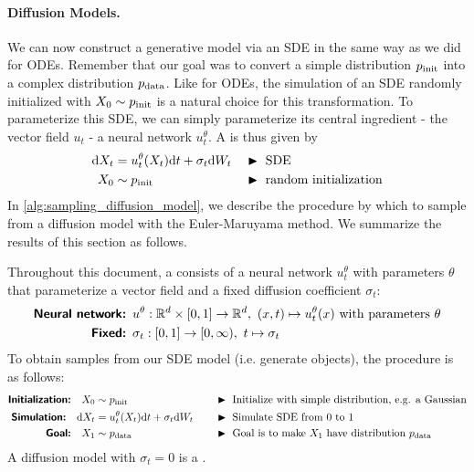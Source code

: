 \paragraph{Diffusion Models.} We can now construct a generative model via an SDE in the same way as we did for ODEs. Remember that our goal was to convert a simple distribution $p_{\rm{init}}$ into a complex distribution $p_{\rm{data}}$. Like for ODEs, the simulation of an SDE randomly initialized with $X_0\sim p_{\rm{init}}$ is a natural choice for this transformation. To parameterize this SDE, we can simply parameterize its central ingredient - the vector field $u_t$ - a neural network $u_t^\theta$. A  is thus given by
\begin{align*}
    \mathrm{d} X_t &= u_t^\theta(X_t)\mathrm{d} t + \sigma_t \mathrm{d} W_t &&\blacktriangleright\,\,\text{SDE}\\
    X_0 &\sim p_{\rm{init}}  &&\blacktriangleright\,\,\text{random initialization}
    \end{align*}
In \cref{alg:sampling_diffusion_model}, we describe the procedure by which to sample from a diffusion model with the Euler-Maruyama method. We summarize the results of this section as follows.
\begin{summarybox} Throughout this document, a  consists of a neural network $u_t^\theta$ with parameters $\theta$ that parameterize a vector field and a fixed  diffusion coefficient $\sigma_t$:
\begin{align*}
    \textbf{\sffamily Neural network: }&u^\theta:\R^d\times [0,1]\to \R^d,\,\, (x,t)\mapsto u_t^\theta(x)\text{  with parameters }\theta\\
    \textbf{\sffamily Fixed: }&\sigma_t:[0,1]\to [0,\infty),\,\, t\mapsto \sigma_t
\end{align*}
To obtain samples from our SDE model (i.e. generate objects), the procedure is as follows:
\begin{align*}
\textbf{\sffamily Initialization:}\quad X_0&\sim\pinit \quad  &&\blacktriangleright\,\,\text{Initialize with simple distribution, e.g. a Gaussian}\\
    \textbf{\sffamily Simulation:}\quad \dd X_t &= u_t^\theta(X_t)\dd t + \sigma_t\dd W_t\quad &&\blacktriangleright\,\,\text{Simulate SDE from 0 to 1}\\
    \textbf{\sffamily Goal:}\quad X_1 &\sim  \pdata \quad &&\blacktriangleright\,\,\text{Goal is to make $X_1$ have distribution $\pdata$}
\end{align*}
A diffusion model with $\sigma_t=0$ is a .
\label{summary:diffusion_model}
\end{summarybox}
